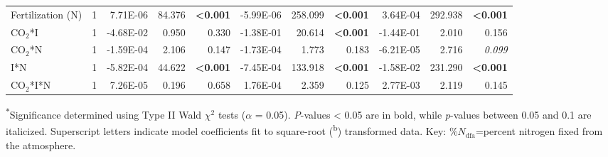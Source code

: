 \begin{landscape}
\begin{table}
{\begin{tabular}{p{3.5cm}p{0.5cm}p{1.75cm}p{1.5cm}p{1.5cm}p{1.75cm}p{1.5cm}p{1.5cm}p{1.75cm}p{1.5cm}p{1.5cm}}
            Fertilization (N) & \multicolumn{1}{r}{1}
            & \multicolumn{1}{r}{7.71E-06}      & \multicolumn{1}{r}{84.376}        & \multicolumn{1}{r}{\textbf{<0.001}}
            & \multicolumn{1}{r}{-5.99E-06}     & \multicolumn{1}{r}{258.099}       & \multicolumn{1}{r}{\textbf{<0.001}}
            & \multicolumn{1}{r}{3.64E-04}      & \multicolumn{1}{r}{292.938}       & \multicolumn{1}{r}{\textbf{<0.001}} 
            \\

            CO$_2$*I & \multicolumn{1}{r}{1}
            & \multicolumn{1}{r}{-4.68E-02}     & \multicolumn{1}{r}{0.950}         & \multicolumn{1}{r}{0.330}
            & \multicolumn{1}{r}{-1.38E-01}     & \multicolumn{1}{r}{20.614}        & \multicolumn{1}{r}{\textbf{<0.001}}
            & \multicolumn{1}{r}{-1.44E-01}     & \multicolumn{1}{r}{2.010}         & \multicolumn{1}{r}{0.156} 
            \\

            CO$_2$*N & \multicolumn{1}{r}{1}
            & \multicolumn{1}{r}{-1.59E-04}     & \multicolumn{1}{r}{2.106}         & \multicolumn{1}{r}{0.147}
            & \multicolumn{1}{r}{-1.73E-04}     & \multicolumn{1}{r}{1.773}         & \multicolumn{1}{r}{0.183}
            & \multicolumn{1}{r}{-6.21E-05}     & \multicolumn{1}{r}{2.716}         & \multicolumn{1}{r}{\textit{0.099}} 
            \\

            I*N & \multicolumn{1}{r}{1}
            & \multicolumn{1}{r}{-5.82E-04}     & \multicolumn{1}{r}{44.622}        & \multicolumn{1}{r}{\textbf{<0.001}}
            & \multicolumn{1}{r}{-7.45E-04}     & \multicolumn{1}{r}{133.918}       & \multicolumn{1}{r}{\textbf{<0.001}}
            & \multicolumn{1}{r}{-1.58E-02}     & \multicolumn{1}{r}{231.290}       & \multicolumn{1}{r}{\textbf{<0.001}} 
            \\

            CO$_2$*I*N & \multicolumn{1}{r}{1}
            & \multicolumn{1}{r}{7.26E-05}      & \multicolumn{1}{r}{0.196}         & \multicolumn{1}{r}{0.658}
            & \multicolumn{1}{r}{1.76E-04}      & \multicolumn{1}{r}{2.359}         & \multicolumn{1}{r}{0.125}
            & \multicolumn{1}{r}{2.77E-03}      & \multicolumn{1}{r}{2.119}         & \multicolumn{1}{r}{0.145} 
            \\
            \hline
    \end{tabular}}
    \label{tab:table5.5}
    \end{table}
\begin{singlespace}
    \noindent \textsuperscript{$*$}Significance determined using Type II Wald $\chi^{2}$ tests ($\alpha$ = 0.05). \textit{P}-values < 0.05 are in bold, while \textit{p}-values between 0.05 and 0.1 are italicized. Superscript letters indicate model coefficients fit to square-root (\textsuperscript{b}) transformed data. Key: \%$N_\mathrm{dfa}$=percent nitrogen fixed from the atmosphere.
\end{singlespace}
\end{landscape}
\clearpage

